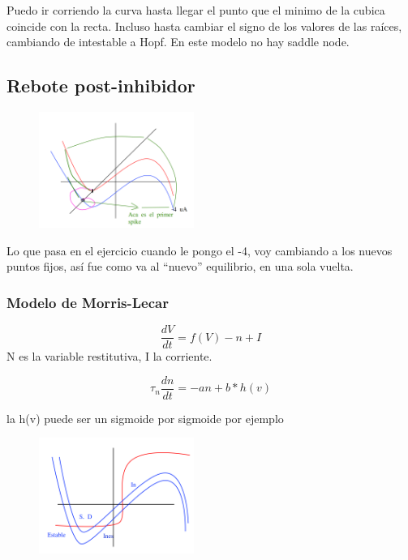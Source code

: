 Puedo ir corriendo la curva hasta llegar el punto que el minimo de la cubica coincide con la recta. Incluso hasta cambiar el signo de los valores de las raíces, cambiando de intestable a Hopf. En este modelo no hay saddle node.

\subsection{Rebote post-inhibidor}

\begin{figure}[htbp]
	\centering
	\includegraphics[width=0.45\textwidth]{4.png}
\end{figure}


Lo que pasa en el ejercicio cuando le pongo el -4, voy cambiando a los nuevos puntos fijos, así fue como va al ``nuevo'' equilibrio, en una sola vuelta. 


\subsubsection{Modelo de Morris-Lecar}
\begin{equation}
	\frac{dV}{dt} = f(V) -n + I
\end{equation}
N es la variable restitutiva, I la corriente.

\begin{equation}
	\tau_n \frac{dn}{dt}= -an + b*h(v)
\end{equation}

la h(v) puede ser un sigmoide por sigmoide por ejemplo

\begin{figure}[H]
	\centering
	\includegraphics[width=0.45\textwidth]{5.png}
\end{figure}

